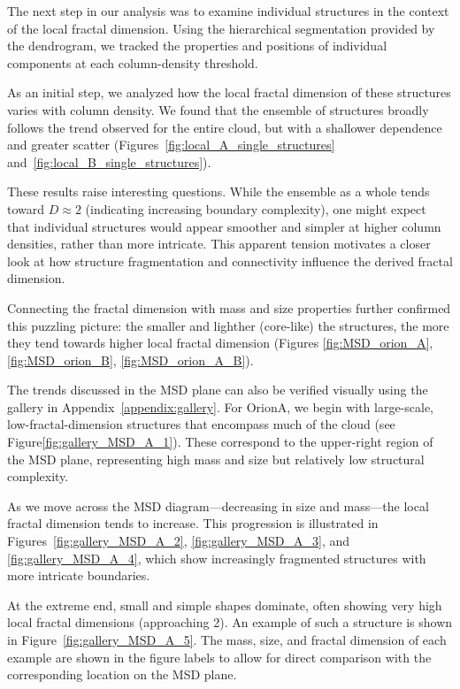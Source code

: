 The next step in our analysis was to examine individual structures in the context of the local fractal dimension.  
Using the hierarchical segmentation provided by the dendrogram, we tracked the properties and positions of individual components at each column-density threshold.

As an initial step, we analyzed how the local fractal dimension of these structures varies with column density.  
We found that the ensemble of structures broadly follows the trend observed for the entire cloud, but with a shallower dependence and greater scatter (Figures~\ref{fig:local_A_single_structures} and~\ref{fig:local_B_single_structures}).  

These results raise interesting questions.  
While the ensemble as a whole tends toward \(D \approx 2\) (indicating increasing boundary complexity), one might expect that individual structures would appear smoother and simpler at higher column densities, rather than more intricate.  
This apparent tension motivates a closer look at how structure fragmentation and connectivity influence the derived fractal dimension.

Connecting the fractal dimension with mass and size properties further confirmed this puzzling picture: the smaller and lighther (core-like) the structures, the more they tend towards higher local fractal dimension (Figures \ref{fig:MSD_orion_A}, \ref{fig:MSD_orion_B}, \ref{fig:MSD_orion_A_B}).

The trends discussed in the MSD plane can also be verified visually using the gallery in Appendix~\ref{appendix:gallery}.
For OrionA, we begin with large-scale, low-fractal-dimension structures that encompass much of the cloud (see Figure\ref{fig:gallery_MSD_A_1}). These correspond to the upper-right region of the MSD plane, representing high mass and size but relatively low structural complexity.

As we move across the MSD diagram—decreasing in size and mass—the local fractal dimension tends to increase.
This progression is illustrated in Figures~\ref{fig:gallery_MSD_A_2}, \ref{fig:gallery_MSD_A_3}, and \ref{fig:gallery_MSD_A_4}, which show increasingly fragmented structures with more intricate boundaries.

At the extreme end, small and simple shapes dominate, often showing very high local fractal dimensions (approaching 2).
An example of such a structure is shown in Figure~\ref{fig:gallery_MSD_A_5}.
The mass, size, and fractal dimension of each example are shown in the figure labels to allow for direct comparison with the corresponding location on the MSD plane.

